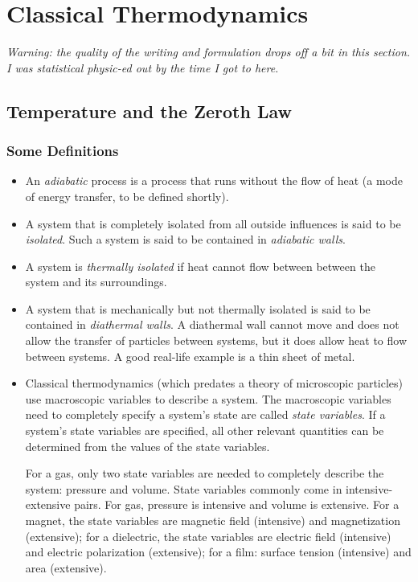 \documentclass[11pt, a4paper]{article}
\begin{document}
\section{Classical Thermodynamics}
\textit{Warning: the quality of the writing and formulation drops off a bit in this section. I was statistical physic-ed out by the time I got to here.}
\subsection{Temperature and the Zeroth Law}
\subsubsection{Some Definitions}
\begin{itemize}
	\item An \textit{adiabatic} process is a process that runs without the flow of heat (a mode of energy transfer, to be defined shortly).
	
	\item A system that is completely isolated from all outside influences is said to be \textit{isolated}. Such a system is said to be contained in \textit{adiabatic walls}.
	
	\item A system is \textit{thermally isolated} if heat cannot flow between between the system and its surroundings. 
	
	\item A system that is mechanically but not thermally isolated is said to be contained in \textit{diathermal walls}. A diathermal wall cannot move and does not allow the transfer of particles between systems, but it does allow heat to flow between systems. A good real-life example is a thin sheet of metal.
	
	\item Classical thermodynamics (which predates a theory of microscopic particles) use macroscopic variables to describe a system. The macroscopic variables need to completely specify a system's state are called \textit{state variables}. If a system's state variables are specified, all other relevant quantities can be determined from the values of the state variables.
	
	For a gas, only two state variables are needed to completely describe the system: pressure and volume. State variables commonly come in intensive-extensive pairs. For gas, pressure is intensive and volume is extensive. For a magnet, the state variables are magnetic field (intensive) and magnetization (extensive); for a dielectric, the state variables are electric field (intensive) and electric polarization (extensive); for a film: surface tension (intensive) and area (extensive).  
	

\end{itemize}
\end{document}
